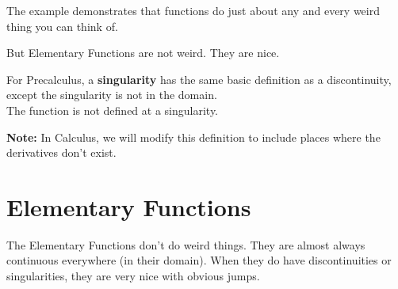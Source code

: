 \documentclass{ximera}
\begin{document}
The example demonstrates that functions do just about any and every weird thing you can think of.

But Elementary Functions are not weird.  They are nice.  





\begin{definition}

For Precalculus, a \textbf{singularity} has the same basic definition as a discontinuity, except the singularity is not in the domain. \\


The function is not defined at a singularity.

\end{definition}

\textbf{Note:} In Calculus, we will modify this definition to include places where the derivatives don't exist. 










\section{Elementary Functions}




The Elementary Functions don't do weird things.  They are almost always continuous everywhere (in their domain).  When they do have discontinuities or singularities, they are very nice with obvious jumps.
\end{document}
